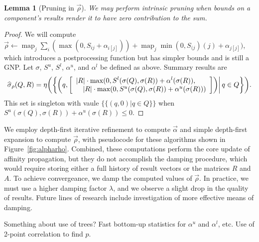 \documentclass{article}
\newtheorem{lemma}{Lemma}
\newcommand{\killspace}{\vspace{-0.08in}}
\newcommand{\sigmahat}{\mathbin{\widehat{\sigma}}}
\DeclareMathOperator*{\map}{map}
\newcommand{\simhrectmin}{S^{l}}
\newcommand{\simhrectmax}{S^{u}}
\newcommand{\simil}[2]{S_{#1#2}}
\newcommand{\vecrho}{\vec{\rho}}
\newcommand{\vecalpha}{\vec{\alpha}}
\newcommand{\falphaj}[2]{\alpha_{#1[#2]}}
\newcommand{\falphamax}{\alpha^{u}}
\newcommand{\falphamin}{\alpha^{l}}
\begin{document}
\begin{lemma}[Pruning in $\vecrho$]
  We may perform intrinsic pruning when bounds on a component's
  results render it to have zero contribution to the sum.
\end{lemma}
\killspace
\begin{proof}
  We will compute $\vecrho \gets \map_j \sum_i ( \max(0,\simil{i}{j} +
  \falphaj{i}{j}) ) + \map_j \min(0,\simil(j)(j) + \falphaj{j}{j})$,
  which introduces a postprocessing function but has simpler bounds
  and is still a GNP.  Let $\sigma$, $\simhrectmax$, $\simhrectmin$,
  $\falphamax$, and $\falphamin$ be defined as above.  Summary results
  are
  \[
  \sigmahat_{\rho}(Q,R) = \eta \!\left( \left\{ \left.\! \left( q, \left[ \begin{array}{ll}
    \lefteqn{|R| \cdot \max(0,\simhrectmin(\sigma(Q),\sigma(R)) + \falphamin(\sigma(R)),} \\
    & |R| \cdot \max(0,\simhrectmax(\sigma(Q),\sigma(R)) + \falphamax(\sigma(R)))
  \end{array} \right] \right) \right| q \in Q \right\} \right)\! .
  \]
  This set is singleton with vaule $\{\{(q,0) | q \in Q\}\}$ when
  $\simhrectmax(\sigma(Q),\sigma(R)) + \falphamax(\sigma(R)) \leq 0$.
\end{proof}

We employ depth-first iterative refinement to compute $\vecalpha$ and
simple depth-first expansion to compute $\vecrho$, with pseudocode for
these algorithms shown in Figure~\ref{fig:alpharho}.  Combined, these
computations perform the core update of affinity propagation, but they
do not accomplish the damping procedure, which would require storing
either a full history of result vectors or the matrices $R$ and $A$.
To achieve convergeance, we damp the computed values of $\vecrho$.  In
practice, we must use a higher damping factor $\lambda$, and we
observe a slight drop in the quality of results.  Future lines of
research include investigation of more effective means of damping.

Something about use of trees?  Fast bottom-up statistics for
$\falphamax$ and $\falphamin$, etc.  Use of 2-point correlation to find $p$.
\end{document}
